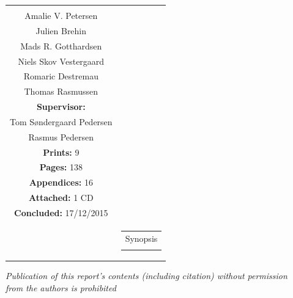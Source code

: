 \begin{titlepage}
\begin{nopagebreak}
{\begin{tabular}{cc}
{{\textbf{Participants:}\\
Amalie V. Petersen\\
Julien Brehin\\
Mads R. Gotthardsen\\
Niels Skov Vestergaard\\
Romaric Destremau\\
Thomas Rasmussen\\

\textbf{Supervisor:}\\
Tom Søndergaard Pedersen\\ %
Rasmus Pedersen
}\\

\textbf{Prints:} 9\\ %
\textbf{Pages:} 138\\ %
\textbf{Appendices:} 16\\ %
\textbf{Attached:} 1 CD\\
\textbf{Concluded:} 17/12/2015\\

\vfill } &
\parbox{7cm}{
  \vspace{.15cm}
  \hfill 
  \begin{tabular}{l}
  {Synopsis}\bigskip \\
  \fbox{
    \parbox{6.5cm}{\bigskip
     {\vfill{\small 
     \bigskip}}
     }}
   \end{tabular}}
\end{tabular}} %

\textit{\phantom{A}Publication of this report's contents (including citation) without permission\\ \phantom{A}from the authors is prohibited}\\

\end{nopagebreak}
\end{titlepage}
%